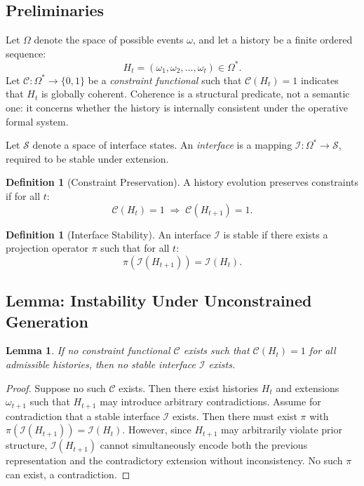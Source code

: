 \documentclass[12pt, a4paper]{article}
\theoremstyle{plain}
\newtheorem{lemma}[theorem]{Lemma}
\theoremstyle{definition}
\newtheorem{definition}[theorem]{Definition}
\theoremstyle{remark}
\begin{document}
\subsection{Preliminaries}

Let $\Omega$ denote the space of possible events $\omega$, and let a history be a finite ordered sequence:
\[
H_t = (\omega_1, \omega_2, \dots, \omega_t) \in \Omega^*.
\]
Let $\mathcal{C} : \Omega^* \to \{0,1\}$ be a \emph{constraint functional} such that $\mathcal{C}(H_t) = 1$ indicates that $H_t$ is globally coherent. Coherence is a structural predicate, not a semantic one: it concerns whether the history is internally consistent under the operative formal system.

Let $\mathcal{S}$ denote a space of interface states. An \emph{interface} is a mapping $\mathcal{I} : \Omega^* \to \mathcal{S}$, required to be stable under extension.

\begin{definition}[Constraint Preservation]
A history evolution preserves constraints if for all $t$:
\[
\mathcal{C}(H_t) = 1 \;\Rightarrow\; \mathcal{C}(H_{t+1}) = 1.
\]
\end{definition}

\begin{definition}[Interface Stability]
An interface $\mathcal{I}$ is stable if there exists a projection operator $\pi$ such that for all $t$:
\[
\pi(\mathcal{I}(H_{t+1})) = \mathcal{I}(H_t).
\]
\end{definition}

\subsection{Lemma: Instability Under Unconstrained Generation}

\begin{lemma}
If no constraint functional $\mathcal{C}$ exists such that $\mathcal{C}(H_t) = 1$ for all admissible histories, then no stable interface $\mathcal{I}$ exists.
\end{lemma}

\begin{proof}
Suppose no such $\mathcal{C}$ exists. Then there exist histories $H_t$ and extensions $\omega_{t+1}$ such that $H_{t+1}$ may introduce arbitrary contradictions. Assume for contradiction that a stable interface $\mathcal{I}$ exists. Then there must exist $\pi$ with $\pi(\mathcal{I}(H_{t+1})) = \mathcal{I}(H_t)$. However, since $H_{t+1}$ may arbitrarily violate prior structure, $\mathcal{I}(H_{t+1})$ cannot simultaneously encode both the previous representation and the contradictory extension without inconsistency. No such $\pi$ can exist, a contradiction.
\end{proof}
\end{document}
